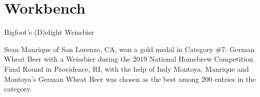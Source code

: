 \documentclass[10pt,oneside]{scrbook}
\begin{document}
\mainmatter
\twocolumn

\part{Workbench}

\begin{recipie}{Bigfoot's (D)elight Weissbier}

\begin{aboutblock}
Sean Manrique of San Lorenzo, CA, won a gold medal in Category \#7: German Wheat
Beer with a Weissbier during the 2019 National Homebrew Competition Final Round
in Providence, RI, with the help of Indy Montoya. Manrique and Montoya's German
Wheat Beer was chosen as the best among 200 entries in the category.
\end{aboutblock}


\begin{methodandtiming}
 
\begin{mashsteps}
\end{mashsteps}

\begin{fermentationsteps}
\end{fermentationsteps}

\end{methodandtiming}

\pagebreak

\begin{ingredientsblock}

\begin{malts}
\end{malts}

\begin{hops}
\end{hops}

\begin{yeasts}
\end{yeasts}

\end{ingredientsblock}

\end{recipie}

\backmatter


\end{document}
